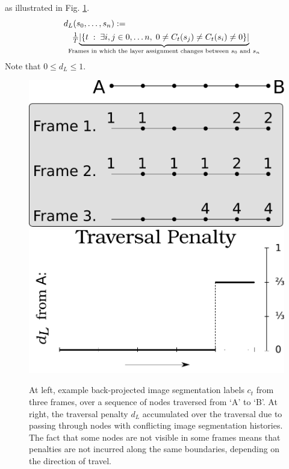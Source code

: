 as illustrated
in Fig. \ref{fig:layerPenalty}.
\begin{align}
&d_L(s_0,\ldots,s_n) := \notag \\
&\quad\tfrac{1}{T}
\underset{\mathclap{\text{Frames in which the layer assignment changes between $s_0$ and $s_n$}}}
{\underbrace{|\{t\;:\;\exists i,j\in 0,\ldots n,\;
0\neq C_t(s_j)\neq C_t(s_i)\neq 0\}|}}
\label{eq:dl}
\end{align}
Note that $0\leq d_L\leq 1$. 

\begin{figure}
    \centering
    \includegraphics[width=0.45\linewidth]{figs/layer_histories.pdf}\qquad
    \includegraphics[width=0.45\linewidth]{figs/traversed_distances.pdf}
    \caption{\small At left, example back-projected image segmentation labels $c_t$ from three frames, over a sequence of nodes traversed from `A' to `B'. At right, the traversal penalty $d_L$ accumulated over the traversal due to passing through nodes with conflicting image segmentation histories. The fact that some nodes are not visible in some frames means that penalties are not
    incurred along the same boundaries, depending on the direction of travel.}
\label{fig:layerPenalty}

\end{figure}


